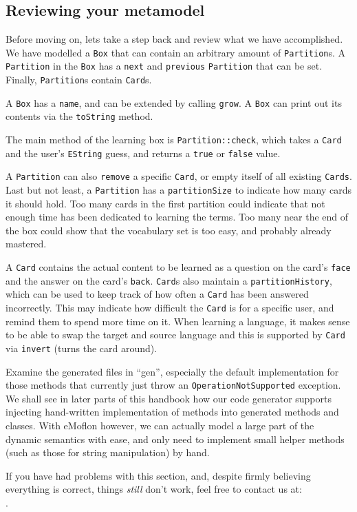 \newpage 
\genHeader
\subsection{Reviewing your metamodel}
\hypertarget{static review}{}

Before moving on, lets take a step back and review what we have accomplished. We have modelled a \texttt{Box} that can contain an arbitrary amount of
\texttt{Partition}s. A \texttt{Partition} in the \texttt{Box} has a \texttt{next} and \texttt{previous} \texttt{Partition} that can be set. Finally,
\texttt{Partition}s contain \texttt{Card}s.

A \texttt{Box} has a \texttt{name}, and can be extended by calling \texttt{grow}. A \texttt{Box} can print out its contents via the \texttt{toString} method.

The main method of the learning box is \texttt{Partition::check}, which takes a \texttt{Card} and the user's \texttt{EString} guess, and returns a \texttt{true}
or \texttt{false} value.

A \texttt{Partition} can also \texttt{remove} a specific \texttt{Card}, or empty itself of all  existing \texttt{Cards}. Last but not least, a
\texttt{Partition} has a \texttt{partitionSize} to indicate how many cards it should hold. Too many cards in the first partition could indicate that not
enough time has been dedicated to learning the terms. Too many near the end of the box could show that the vocabulary set is too easy, and probably
already mastered.

A \texttt{Card} contains the actual content to be learned as a question on the card's \texttt{face} and the answer on the card's \texttt{back}. \texttt{Card}s
also maintain a \texttt{partition\-History}, which can be used to keep track of how often a \texttt{Card} has been answered incorrectly.
This may indicate how difficult the \texttt{Card} is for a specific user, and remind them to spend more time on it. When learning a language, it makes
sense to be able to swap the target and source language and this is supported by \texttt{Card} via \texttt{invert} (turns the card around).

Examine the generated files in ``gen'', especially the default implementation for those methods that currently just throw an \texttt{OperationNotSupported}
exception. We shall see in later parts of this handbook how our code generator supports injecting hand-written implementation of methods into generated methods
and classes. With eMoflon however, we can actually model a large part of the dynamic semantics with ease, and only need to implement small helper methods (such
as those for string manipulation) by hand.

If you have had problems with this section, and, despite firmly believing everything is correct, things \emph{still} don't work, feel free to contact us at:\\ 
\eMoflonContact.

